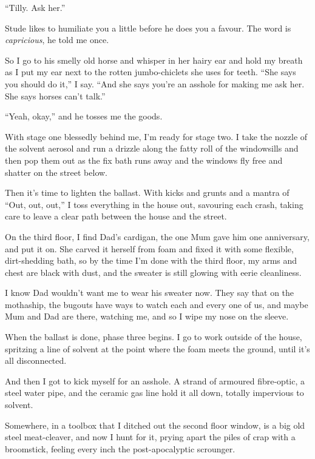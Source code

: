 ``Tilly. Ask her.''

Stude likes to humiliate you a little before he does you a favour.
The word is \emph{capricious}, he told me once.

So I go to his smelly old horse and whisper in her hairy ear and
hold my breath as I put my ear next to the rotten jumbo-chiclets
she uses for teeth. ``She says you should do it,'' I say.
``And she says you're an asshole for making me ask her. She says horses can't 
talk.''

``Yeah, okay,'' and he tosses me the goods.

\tb

With stage one blessedly behind me, I'm ready for stage two. I take
the nozzle of the solvent aerosol and run a drizzle along the fatty
roll of the windowsills and then pop them out as the fix bath runs
away and the windows fly free and shatter on the street below.

Then it's time to lighten the ballast. With kicks and grunts and a
mantra of ``Out, out, out,'' I toss everything in the house out,
savouring each crash, taking care to leave a clear path between the
house and the street.

On the third floor, I find Dad's cardigan, the one Mum gave him one
anniversary, and put it on. She carved it herself from foam and
fixed it with some flexible, dirt-shedding bath, so by the time I'm
done with the third floor, my arms and chest are black with dust,
and the sweater is still glowing with eerie cleanliness.

I know Dad wouldn't want me to wear his sweater now. They say that
on the mothaship, the bugouts have ways to watch each and every one
of us, and maybe Mum and Dad are there, watching me, and so I wipe
my nose on the sleeve.

\tb

When the ballast is done, phase three begins. I go to work outside
of the house, spritzing a line of solvent at the point where the
foam meets the ground, until it's all disconnected.

And then I got to kick myself for an asshole. A strand of armoured
fibre-optic, a steel water pipe, and the ceramic gas line hold it
all down, totally impervious to solvent.

Somewhere, in a toolbox that I ditched out the second floor window,
is a big old steel meat-cleaver, and now I hunt for it, prying
apart the piles of crap with a broomstick, feeling every inch the
post-apocalyptic scrounger.


